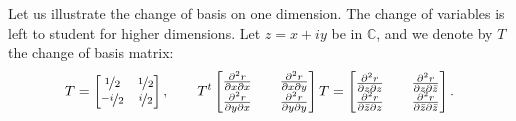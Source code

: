 \documentclass[12pt,openany]{book}
\newcommand{\C}{{\mathbb{C}}}
\theoremstyle{plain}
\theoremstyle{remark}
\theoremstyle{definition}
\theoremstyle{exercise}
\theoremstyle{example}
\begin{document}
Let us illustrate the change of basis on one dimension.  The change of
variables is left to student for higher dimensions.  Let $z =
x+iy$ be in $\C$, and we denote by $T$ the change of basis matrix:
\begin{equation*}
T = 
\begin{bmatrix}
\nicefrac{1}{2} & \nicefrac{1}{2} \\
\nicefrac{-i}{2} & \nicefrac{i}{2}
\end{bmatrix}
,
\qquad
T^t
\begin{bmatrix}
\frac{\partial^2 r}{\partial x \partial x} &&
\frac{\partial^2 r}{\partial x \partial y}
\\
\frac{\partial^2 r}{\partial y \partial x} &&
\frac{\partial^2 r}{\partial y \partial y}
\end{bmatrix}
T
=
\begin{bmatrix}
\frac{\partial^2 r}{\partial z \partial z} &&
\frac{\partial^2 r}{\partial z \partial \bar{z}}
\\
\frac{\partial^2 r}{\partial \bar{z} \partial z} &&
\frac{\partial^2 r}{\partial \bar{z} \partial \bar{z}}
\end{bmatrix}
.
\end{equation*}
\end{document}
